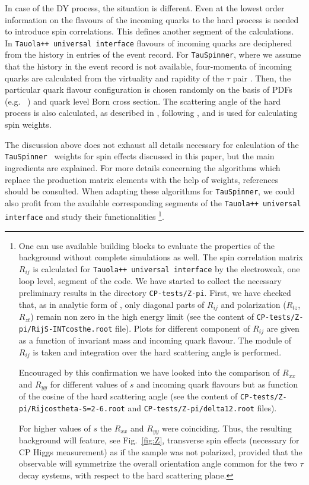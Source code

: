 \documentclass[12pt]{article}
\begin{document}
In case of the  DY process, the situation is different. Even at the lowest order
information on the flavours of the incoming quarks to the hard process is needed to introduce spin correlations.
 This defines another segment of the calculations. 
In  {\tt Tauola++ universal interface} flavours of incoming quarks are deciphered from the history in entries of
 the event record. For {\tt TauSpinner}, where we assume that the history in the event record is not available,
 four-momenta of incoming quarks are calculated from 
the virtuality and rapidity of the $\tau$ pair \cite{Czyczula:2012ny}. Then, the particular quark flavour configuration 
is chosen randomly on the basis of PDFs (e.g. ~\cite{Whalley:2005nh,LHAPDF-pdfsets}) and quark level Born cross section.
The scattering angle of the hard process is also calculated, as described in \cite{Czyczula:2012ny},
following \cite{Was:1989ce}, and is used for calculating spin weights.

The discussion above does not exhaust all details necessary for calculation of the {\tt TauSpinner } weights
for spin effects discussed in this paper, but the main 
ingredients are explained. For more details concerning the algorithms which replace the 
production matrix
elements with the help of weights, references \cite{Czyczula:2012ny,Banerjee:2012ez, TauSpinner2014}  should be consulted.
When adapting these algorithms for {\tt TauSpinner}, we could also profit from the available corresponding segments of the
 {\tt Tauola++ universal interface} and study their functionalities%
\footnote{
One can use available building blocks to evaluate the properties of the background 
without complete simulations as well. The spin correlation matrix $R_{ij}$ is calculated for 
{\tt Tauola++ universal interface} by the electroweak, one loop level, segment of the code. We have started to collect the necessary 
preliminary results in the directory  {\tt CP-tests/Z-pi}. First, we have checked
that, as in analytic form of \cite{jadach-was:1984}, only diagonal   parts of $R_{ij}$ and polarization ($R_{tz}$, $R_{zt}$) remain non zero in the 
high energy limit
(see the content of {\tt CP-tests/Z-pi/RijS-INTcosthe.root} file).
Plots for different component of $R_{ij}$  are given as a function of invariant mass and incoming quark 
flavour. The module of $R_{ij}$ is taken and integration over the hard scattering angle is performed.

Encouraged by this confirmation we have looked into the comparison of 
$R_{xx}$ and $R_{yy}$ for different values of $s$ and incoming quark flavours but as
function of the cosine of the hard scattering angle 
(see the content of {\tt CP-tests/Z-pi/Rijcostheta-S=2-6.root} and {\tt CP-tests/Z-pi/delta12.root} files).%

For higher values of $s$ the $R_{xx}$ and $R_{yy}$ were coinciding. 
Thus, the resulting background will feature, see Fig.~\ref{fig:Z}, transverse spin 
effects (necessary for CP Higgs measurement) as if the sample 
was not polarized, provided that the observable will symmetrize the overall 
orientation angle common for the two $\tau$ decay systems, with respect to 
the hard scattering plane.}.
\end{document}
